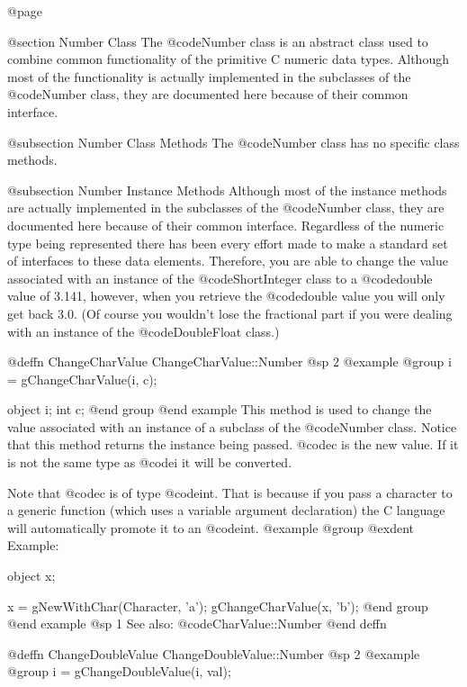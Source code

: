 @page

@section Number Class
The @code{Number} class is an abstract class used to combine common
functionality of the primitive C numeric data types.  Although most of the
functionality is actually implemented in the subclasses of the @code{Number}
class, they are documented here because of their common interface.


@subsection Number Class Methods
The @code{Number} class has no specific class methods.


@subsection Number Instance Methods
Although most of the instance methods are actually implemented in the
subclasses of the @code{Number} class, they are documented here because
of their common interface.  Regardless of the numeric type being
represented there has been every effort made to make a standard set of
interfaces to these data elements.  Therefore, you are able to change
the value associated with an instance of the @code{ShortInteger} class
to a @code{double} value of 3.141, however, when you retrieve the
@code{double} value you will only get back 3.0.  (Of course you
wouldn't lose the fractional part if you were dealing with an instance
of the @code{DoubleFloat} class.)





@deffn {ChangeCharValue} ChangeCharValue::Number
@sp 2
@example
@group
i = gChangeCharValue(i, c);

object  i;
int     c;
@end group
@end example
This method is used to change the value associated with an instance of
a subclass of the @code{Number} class.  Notice that this method
returns the instance being passed.  @code{c} is the new value.
If it is not the same type as @code{i} it will be converted.

Note that @code{c} is of type @code{int}.  That is because if you pass a
character to a generic function (which uses a variable argument
declaration) the C language will automatically promote it to an
@code{int}.
@example
@group
@exdent Example:

object  x;

x = gNewWithChar(Character, 'a');
gChangeCharValue(x, 'b');
@end group
@end example
@sp 1
See also:  @code{CharValue::Number}
@end deffn












@deffn {ChangeDoubleValue} ChangeDoubleValue::Number
@sp 2
@example
@group
i = gChangeDoubleValue(i, val);

